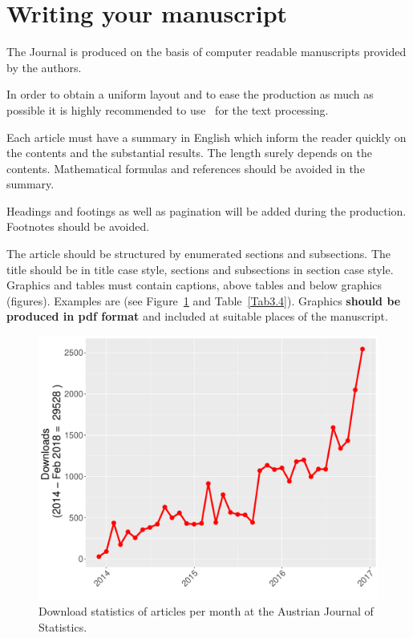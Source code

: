 \documentclass[article]{ajs}
\begin{document}


\section{Writing your manuscript}

The Journal is produced on the basis of computer readable
manuscripts provided by the authors. 


In order to obtain a uniform layout and to ease the production as
much as possible it is highly recommended to use \LaTeXe\ for the
text processing. 

Each article must have a summary in English which
inform the reader quickly on the contents and the substantial
results. The length surely depends on the contents. 
Mathematical formulas and references should be
avoided in the summary.

Headings and footings as well as pagination will be added during
the production. Footnotes should be avoided.

The article should be structured by enumerated sections and
subsections. The title should be in title case style, sections and subsections in section case style. Graphics and tables must contain captions, above
tables and below graphics (figures). Examples are (see Figure~\ref{Fig3.4} and Table~\ref{Tab3.4}).
Graphics \textbf{should be produced in \textbf{pdf} format} and included 
 at suitable places of the manuscript. 

\begin{figure}[hbt]
\begin{center}
\includegraphics{ajs-download20180210}
\caption{\label{Fig3.4}Download statistics of articles per month at the Austrian Journal of Statistics.} 
\end{center}
\end{figure}
\end{document}
